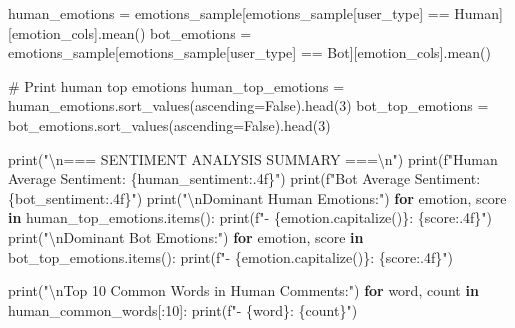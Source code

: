 \documentclass[
  12pt,
  letterpaper,
  DIV=11,
  numbers=noendperiod]{scrartcl}
\newenvironment{Shaded}{\begin{snugshade}}{\end{snugshade}}
\newcommand{\BuiltInTok}[1]{\textcolor[rgb]{0.00,0.23,0.31}{#1}}
\newcommand{\CharTok}[1]{\textcolor[rgb]{0.13,0.47,0.30}{#1}}
\newcommand{\CommentTok}[1]{\textcolor[rgb]{0.37,0.37,0.37}{#1}}
\newcommand{\ControlFlowTok}[1]{\textcolor[rgb]{0.00,0.23,0.31}{\textbf{#1}}}
\newcommand{\DecValTok}[1]{\textcolor[rgb]{0.68,0.00,0.00}{#1}}
\newcommand{\KeywordTok}[1]{\textcolor[rgb]{0.00,0.23,0.31}{\textbf{#1}}}
\newcommand{\NormalTok}[1]{\textcolor[rgb]{0.00,0.23,0.31}{#1}}
\newcommand{\OperatorTok}[1]{\textcolor[rgb]{0.37,0.37,0.37}{#1}}
\newcommand{\SpecialCharTok}[1]{\textcolor[rgb]{0.37,0.37,0.37}{#1}}
\newcommand{\SpecialStringTok}[1]{\textcolor[rgb]{0.13,0.47,0.30}{#1}}
\newcommand{\StringTok}[1]{\textcolor[rgb]{0.13,0.47,0.30}{#1}}
\newcommand{\VariableTok}[1]{\textcolor[rgb]{0.07,0.07,0.07}{#1}}
\begin{document}
\begin{Shaded}
\begin{Highlighting}[]
\NormalTok{human\_emotions }\OperatorTok{=}\NormalTok{ emotions\_sample[emotions\_sample[}\StringTok{\textquotesingle{}user\_type\textquotesingle{}}\NormalTok{] }\OperatorTok{==} \StringTok{\textquotesingle{}Human\textquotesingle{}}\NormalTok{][emotion\_cols].mean()}
\NormalTok{bot\_emotions }\OperatorTok{=}\NormalTok{ emotions\_sample[emotions\_sample[}\StringTok{\textquotesingle{}user\_type\textquotesingle{}}\NormalTok{] }\OperatorTok{==} \StringTok{\textquotesingle{}Bot\textquotesingle{}}\NormalTok{][emotion\_cols].mean()}

\CommentTok{\# Print human top emotions}
\NormalTok{human\_top\_emotions }\OperatorTok{=}\NormalTok{ human\_emotions.sort\_values(ascending}\OperatorTok{=}\VariableTok{False}\NormalTok{).head(}\DecValTok{3}\NormalTok{)}
\NormalTok{bot\_top\_emotions }\OperatorTok{=}\NormalTok{ bot\_emotions.sort\_values(ascending}\OperatorTok{=}\VariableTok{False}\NormalTok{).head(}\DecValTok{3}\NormalTok{)}

\BuiltInTok{print}\NormalTok{(}\StringTok{"}\CharTok{\textbackslash{}n}\StringTok{=== SENTIMENT ANALYSIS SUMMARY ===}\CharTok{\textbackslash{}n}\StringTok{"}\NormalTok{)}
\BuiltInTok{print}\NormalTok{(}\SpecialStringTok{f"Human Average Sentiment: }\SpecialCharTok{\{}\NormalTok{human\_sentiment}\SpecialCharTok{:.4f\}}\SpecialStringTok{"}\NormalTok{)}
\BuiltInTok{print}\NormalTok{(}\SpecialStringTok{f"Bot Average Sentiment: }\SpecialCharTok{\{}\NormalTok{bot\_sentiment}\SpecialCharTok{:.4f\}}\SpecialStringTok{"}\NormalTok{)}
\BuiltInTok{print}\NormalTok{(}\StringTok{"}\CharTok{\textbackslash{}n}\StringTok{Dominant Human Emotions:"}\NormalTok{)}
\ControlFlowTok{for}\NormalTok{ emotion, score }\KeywordTok{in}\NormalTok{ human\_top\_emotions.items():}
    \BuiltInTok{print}\NormalTok{(}\SpecialStringTok{f"{-} }\SpecialCharTok{\{}\NormalTok{emotion}\SpecialCharTok{.}\NormalTok{capitalize()}\SpecialCharTok{\}}\SpecialStringTok{: }\SpecialCharTok{\{}\NormalTok{score}\SpecialCharTok{:.4f\}}\SpecialStringTok{"}\NormalTok{)}
\BuiltInTok{print}\NormalTok{(}\StringTok{"}\CharTok{\textbackslash{}n}\StringTok{Dominant Bot Emotions:"}\NormalTok{)}
\ControlFlowTok{for}\NormalTok{ emotion, score }\KeywordTok{in}\NormalTok{ bot\_top\_emotions.items():}
    \BuiltInTok{print}\NormalTok{(}\SpecialStringTok{f"{-} }\SpecialCharTok{\{}\NormalTok{emotion}\SpecialCharTok{.}\NormalTok{capitalize()}\SpecialCharTok{\}}\SpecialStringTok{: }\SpecialCharTok{\{}\NormalTok{score}\SpecialCharTok{:.4f\}}\SpecialStringTok{"}\NormalTok{)}

\BuiltInTok{print}\NormalTok{(}\StringTok{"}\CharTok{\textbackslash{}n}\StringTok{Top 10 Common Words in Human Comments:"}\NormalTok{)}
\ControlFlowTok{for}\NormalTok{ word, count }\KeywordTok{in}\NormalTok{ human\_common\_words[:}\DecValTok{10}\NormalTok{]:}
    \BuiltInTok{print}\NormalTok{(}\SpecialStringTok{f"{-} }\SpecialCharTok{\{}\NormalTok{word}\SpecialCharTok{\}}\SpecialStringTok{: }\SpecialCharTok{\{}\NormalTok{count}\SpecialCharTok{\}}\SpecialStringTok{"}\NormalTok{)}


\end{Highlighting}
\end{Shaded}
\end{document}
